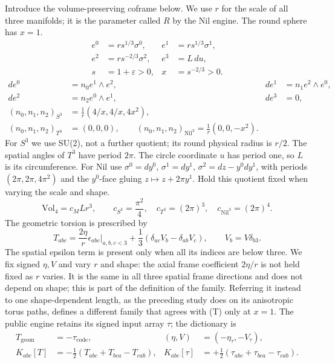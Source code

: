 Introduce the volume-preserving coframe below. We use $r$ for the scale of all three manifolds; it is the parameter called $R$ by the Nil engine. The round sphere has $x=1$.
\begin{equation}
\begin{aligned}
e^0&=r s^{1/3}\sigma^0,&e^1&=r s^{1/3}\sigma^1,\\
e^2&=r s^{-2/3}\sigma^2,&e^3&=L\,du,\\
s&=1+\varepsilon>0,&x&=s^{-2/3}>0.
\end{aligned}
\tag{F}\label{eq:F}
\end{equation}
\begin{equation}
\begin{aligned}
de^0&=n_0 e^1\wedge e^2,&de^1&=n_1 e^2\wedge e^0,\\
de^2&=n_2 e^0\wedge e^1,&de^3&=0,\\
(n_0,n_1,n_2)_{S^3}&=\frac1r(4/x,4/x,4x^2),\\
(n_0,n_1,n_2)_{T^3}&=(0,0,0),
\qquad (n_0,n_1,n_2)_{\mathrm{Nil}^3}=\frac1r(0,0,-x^2).
\end{aligned}
\tag{G}\label{eq:G}
\end{equation}
For $S^3$ we use SU(2), not a further quotient; its round physical radius is $r/2$. The spatial angles of $T^3$ have period $2\pi$. The circle coordinate $u$ has period one, so $L$ is its circumference. For Nil use $\sigma^0=dy^0$, $\sigma^1=dy^1$, $\sigma^2=dz-y^0dy^1$, with periods $(2\pi,2\pi,4\pi^2)$ and the $y^0$-face gluing $z\mapsto z+2\pi y^1$. Hold this quotient fixed when varying the scale and shape.
\begin{equation}
\mathrm{Vol}_4=c_M Lr^3,
\qquad c_{S^3}=\frac{\pi^2}{4},\quad
c_{T^3}=(2\pi)^3,\quad c_{\mathrm{Nil}^3}=(2\pi)^4.
\tag{VOL}\label{eq:VOL}
\end{equation}
The geometric torsion is prescribed by
\begin{equation}
T_{abc}=\frac{2\eta}{r}\epsilon_{abc}\big|_{a,b,c<3}
+\frac13(\delta_{ac}V_b-\delta_{ab}V_c),
\qquad V_b=V\delta_{b3}.
\tag{T}\label{eq:T}
\end{equation}
The spatial epsilon term is present only when all its indices are below three. We fix signed $\eta,V$ and vary $r$ and shape: the axial frame coefficient $2\eta/r$ is not held fixed as $r$ varies. It is the same in all three spatial frame directions and does not depend on shape; this is part of the definition of the family. Referring it instead to one shape-dependent length, as the preceding study does on its anisotropic torus paths,\cite{paper1} defines a different family that agrees with (T) only at $x=1$. The public engine retains its signed input array $\tau$; the dictionary is
\begin{equation}
\begin{aligned}
T_{\mathrm{geom}}&=-\tau_{\mathrm{code}},
& (\eta,V)&=(-\eta_{\tau},-V_{\tau}),\\
K_{abc}[T]&=-\frac12(T_{abc}+T_{bca}-T_{cab}),
&K_{abc}[\tau]&=+\frac12(\tau_{abc}+\tau_{bca}-\tau_{cab}).
\end{aligned}
\tag{D}\label{eq:D}
\end{equation}
